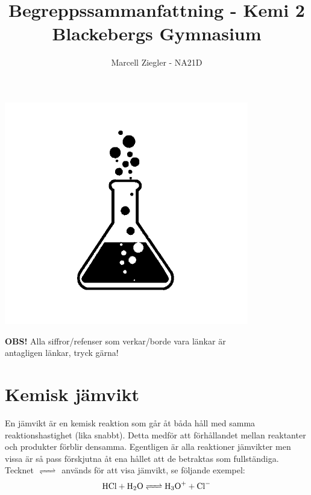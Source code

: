 \documentclass[12pt]{article}
\title{Begreppssammanfattning - Kemi 2 \\ Blackebergs Gymnasium}
\author{Marcell Ziegler - NA21D}
\theoremstyle{definition}
\begin{document}
    \begin{titlepage}
        \maketitle
        \vfill
        \begin{center}
            \includegraphics[width=0.8\textwidth]{title.png}
        \end{center}
        \vfill
        \begin{center}
            \textbf{OBS!} Alla siffror/refenser som verkar/borde vara länkar är \\ antagligen länkar, tryck gärna!
        \end{center}
    \end{titlepage}

    \tableofcontents

    \newpage

    \part{Kemisk jämvikt}
    
    En jämvikt är en kemisk reaktion som går åt båda håll med samma reaktionshastighet (lika snabbt). Detta medför att förhållandet mellan reaktanter och produkter förblir densamma. Egentligen är alla reaktioner jämvikter men vissa är så pass förskjutna åt ena hållet att de betraktas som fullständiga. Tecknet $\ce{<=>}$ används för att visa jämvikt, se följande exempel:
    \begin{equation*}
        \ce{HCl + H2O <=> H3O+ + Cl-}
    \end{equation*}
\end{document}
